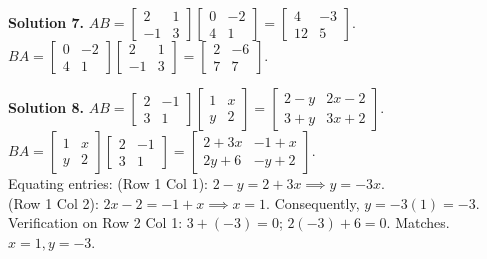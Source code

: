 \documentclass[11pt]{article}
\begin{document}
\vspace{0.2cm}\noindent\textbf{Solution 7.}
$AB = \begin{bmatrix} 2 & 1 \\ -1 & 3 \end{bmatrix} \begin{bmatrix} 0 & -2 \\ 4 & 1 \end{bmatrix} = \begin{bmatrix} 4 & -3 \\ 12 & 5 \end{bmatrix}$.\\
$BA = \begin{bmatrix} 0 & -2 \\ 4 & 1 \end{bmatrix} \begin{bmatrix} 2 & 1 \\ -1 & 3 \end{bmatrix} = \begin{bmatrix} 2 & -6 \\ 7 & 7 \end{bmatrix}$.

\vspace{0.2cm}\noindent\textbf{Solution 8.}
$AB = \begin{bmatrix} 2 & -1 \\ 3 & 1 \end{bmatrix} \begin{bmatrix} 1 & x \\ y & 2 \end{bmatrix} = \begin{bmatrix} 2-y & 2x-2 \\ 3+y & 3x+2 \end{bmatrix}$.\\
$BA = \begin{bmatrix} 1 & x \\ y & 2 \end{bmatrix} \begin{bmatrix} 2 & -1 \\ 3 & 1 \end{bmatrix} = \begin{bmatrix} 2+3x & -1+x \\ 2y+6 & -y+2 \end{bmatrix}$.\\
Equating entries: (Row 1 Col 1): $2-y = 2+3x \implies y = -3x$.\\
(Row 1 Col 2): $2x-2 = -1+x \implies x = 1$. Consequently, $y = -3(1) = -3$.\\
Verification on Row 2 Col 1: $3+(-3) = 0$; $2(-3)+6 = 0$. Matches. \textbf{$x = 1, y = -3$}.
\end{document}
